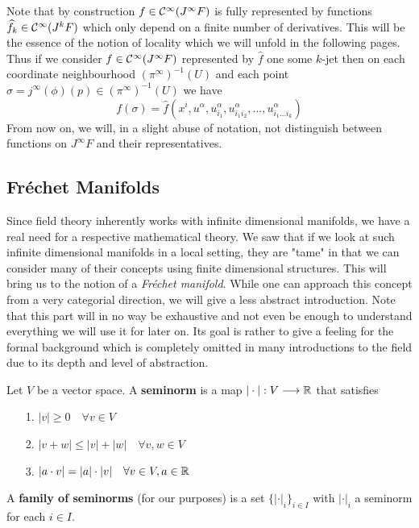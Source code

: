 Note that by construction $f \in \mathcal{C}^{\infty}(J^\infty F)$ is fully represented by functions $\widehat f_k \in \mathcal{C}^{\infty}(J^k F)$ which only depend on a finite number of derivatives. This will be the essence of the notion of locality which we will unfold in the following pages. Thus if we consider $f \in \mathcal{C}^{\infty}(J^\infty F)$ represented by $\widehat f$ one some $k$-jet then on each coordinate neighbourhood $(\pi^\infty)^{-1}(U)$ and each point $\sigma = j^\infty(\phi)(p) \in (\pi^\infty)^{-1}(U)$ we have
$$ f(\sigma) = \widehat f(x^i, u^\alpha, u^\alpha_{i_1}, u^\alpha_{i_1 i_2}, ..., u^\alpha_{i_1 ... i_k})  $$
From now on, we will, in a slight abuse of notation, not distinguish between functions on $J^\infty F$ and their representatives.


\subsection{Fréchet Manifolds}

Since field theory inherently works with infinite dimensional manifolds, we have a real need for a respective mathematical theory. We saw that if we look at such infinite dimensional manifolds in a local setting, they are "tame" in that we can consider many of their concepts using finite dimensional structures. This will bring us to the notion of a \emph{Fréchet manifold}. While one can approach this concept from a very categorial direction, we will give a less abstract introduction. Note that this part will in no way be exhaustive and not even be enough to understand everything we will use it for later on. Its goal is rather to give a feeling for the formal background which is completely omitted in many introductions to the field due to its depth and level of abstraction.

\begin{definition}[Seminorm]
\label{def:Seminorm}
  Let $V$ be a vector space. A \textbf{seminorm} is a map $|\cdot | : V \longrightarrow \mathbb{R}$ that satisfies
  \begin{itemize}
    \item[1.] $|v| \geq 0 \quad \forall v\in V$
    \item[2.] $|v+w| \leq |v| + |w| \quad \forall v,w \in V$
    \item[3.] $|a\cdot v| = |a| \cdot |v| \quad \forall v\in V, a \in \mathbb{R}$
  \end{itemize}
  A \textbf{family of seminorms} (for our purposes) is a set $\{|\cdot |_i\}_{i\in I}$ with $|\cdot|_i$ a seminorm for each $i \in I$.
\end{definition}

